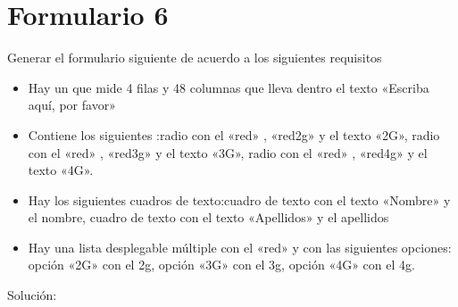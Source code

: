 \documentclass[letterpaper,10pt,spanish]{sphinxmanual}
\begin{document}
\section{Formulario 6}
\label{\detokenize{ejercicios/formularios/anexo_formularios:formulario-6}}
Generar el formulario siguiente de acuerdo a los siguientes requisitos
\begin{itemize}
\item {} 
Hay un  que mide 4 filas y 48 columnas que lleva dentro el texto «Escriba aquí, por favor»

\item {} 
Contiene los siguientes :radio con el   «red» ,   «red2g»  y el texto «2G», radio con el   «red» ,   «red3g»  y el texto «3G», radio con el   «red» ,   «red4g»  y el texto «4G».

\item {} 
Hay los siguientes cuadros de texto:cuadro de texto con el texto «Nombre» y el  nombre, cuadro de texto con el texto «Apellidos» y el  apellidos

\item {} 
Hay una lista desplegable múltiple con el  «red» y con las siguientes opciones: opción «2G» con el  2g, opción «3G» con el  3g, opción «4G» con el  4g.

\end{itemize}


Solución:
\end{document}

